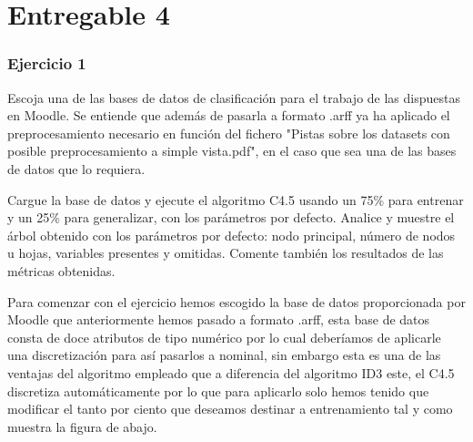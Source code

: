 \chapter{Entregable 4}

\subsection{Ejercicio 1}

Escoja una de las bases de datos de clasificación para el trabajo de las dispuestas en Moodle. Se entiende que además de pasarla a formato .arff ya ha aplicado el preprocesamiento necesario en función del fichero "Pistas sobre los datasets con posible preprocesamiento a simple vista.pdf", en el caso que sea una de las bases de datos que lo requiera.

Cargue la base de datos y ejecute el algoritmo C4.5 usando un 75\% para entrenar y un 25\% para generalizar, con los parámetros por defecto.
Analice y muestre el árbol obtenido con los parámetros por defecto: nodo principal, número de nodos u hojas, variables presentes y omitidas. Comente también los resultados de las métricas obtenidas.

Para comenzar con el ejercicio hemos escogido la base de datos proporcionada por Moodle que anteriormente hemos pasado a formato .arff, esta base de datos consta de doce atributos de tipo numérico por lo cual deberíamos de aplicarle una discretización para así pasarlos a nominal, sin embargo esta es una de las ventajas del algoritmo empleado que a diferencia del algoritmo ID3 este, el C4.5 discretiza automáticamente por lo que para aplicarlo solo hemos tenido que modificar el tanto por ciento que deseamos destinar a entrenamiento tal y como muestra la figura de abajo.

